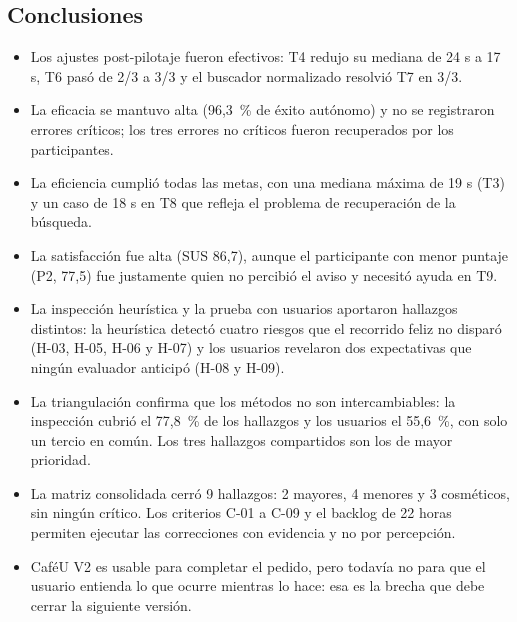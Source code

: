 \documentclass{article}
\begin{document}
\subsection{Conclusiones}
\begin{itemize}[leftmargin=1.5em, itemsep=2pt]
    \item Los ajustes post-pilotaje fueron efectivos: T4 redujo su mediana de 24 s a 17 s, T6 pasó de 2/3 a 3/3 y el buscador normalizado resolvió T7 en 3/3.
    \item La eficacia se mantuvo alta (96,3~\% de éxito autónomo) y no se registraron errores críticos; los tres errores no críticos fueron recuperados por los participantes.
    \item La eficiencia cumplió todas las metas, con una mediana máxima de 19 s (T3) y un caso de 18 s en T8 que refleja el problema de recuperación de la búsqueda.
    \item La satisfacción fue alta (SUS 86,7), aunque el participante con menor puntaje (P2, 77,5) fue justamente quien no percibió el aviso y necesitó ayuda en T9.
    \item La inspección heurística y la prueba con usuarios aportaron hallazgos distintos: la heurística detectó cuatro riesgos que el recorrido feliz no disparó (H-03, H-05, H-06 y H-07) y los usuarios revelaron dos expectativas que ningún evaluador anticipó (H-08 y H-09).
    \item La triangulación confirma que los métodos no son intercambiables: la inspección cubrió el 77,8~\% de los hallazgos y los usuarios el 55,6~\%, con solo un tercio en común. Los tres hallazgos compartidos son los de mayor prioridad.
    \item La matriz consolidada cerró 9 hallazgos: 2 mayores, 4 menores y 3 cosméticos, sin ningún crítico. Los criterios C-01 a C-09 y el backlog de 22 horas permiten ejecutar las correcciones con evidencia y no por percepción.
    \item CaféU V2 es usable para completar el pedido, pero todavía no para que el usuario entienda lo que ocurre mientras lo hace: esa es la brecha que debe cerrar la siguiente versión.
\end{itemize}
\end{document}
